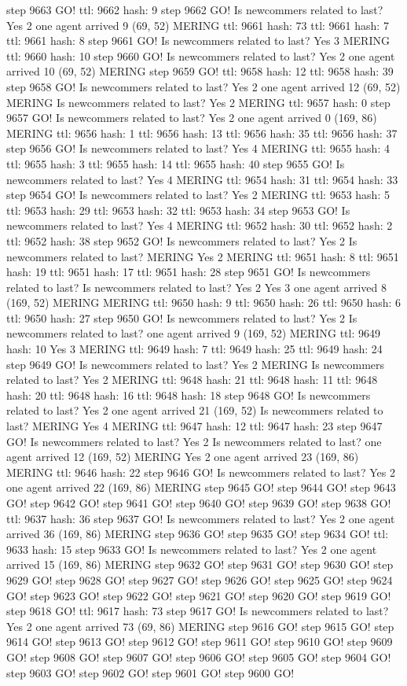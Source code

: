 step 9663 GO! ttl: 9662 hash: 9 step 9662 GO! Is newcommers related to last? Yes 2 one agent arrived 9 (69, 52) MERING ttl: 9661 hash: 73 ttl: 9661 hash: 7 ttl: 9661 hash: 8 step 9661 GO! Is newcommers related to last? Yes 3 MERING ttl: 9660 hash: 10 step 9660 GO! Is newcommers related to last? Yes 2 one agent arrived 10 (69, 52) MERING step 9659 GO! ttl: 9658 hash: 12 ttl: 9658 hash: 39 step 9658 GO! Is newcommers related to last? Yes 2 one agent arrived 12 (69, 52) MERING Is newcommers related to last? Yes 2 MERING ttl: 9657 hash: 0 step 9657 GO! Is newcommers related to last? Yes 2 one agent arrived 0 (169, 86) MERING ttl: 9656 hash: 1 ttl: 9656 hash: 13 ttl: 9656 hash: 35 ttl: 9656 hash: 37 step 9656 GO! Is newcommers related to last? Yes 4 MERING ttl: 9655 hash: 4 ttl: 9655 hash: 3 ttl: 9655 hash: 14 ttl: 9655 hash: 40 step 9655 GO! Is newcommers related to last? Yes 4 MERING ttl: 9654 hash: 31 ttl: 9654 hash: 33 step 9654 GO! Is newcommers related to last? Yes 2 MERING ttl: 9653 hash: 5 ttl: 9653 hash: 29 ttl: 9653 hash: 32 ttl: 9653 hash: 34 step 9653 GO! Is newcommers related to last? Yes 4 MERING ttl: 9652 hash: 30 ttl: 9652 hash: 2 ttl: 9652 hash: 38 step 9652 GO! Is newcommers related to last? Yes 2 Is newcommers related to last? MERING Yes 2 MERING ttl: 9651 hash: 8 ttl: 9651 hash: 19 ttl: 9651 hash: 17 ttl: 9651 hash: 28 step 9651 GO! Is newcommers related to last? Is newcommers related to last? Yes 2 Yes 3 one agent arrived 8 (169, 52) MERING MERING ttl: 9650 hash: 9 ttl: 9650 hash: 26 ttl: 9650 hash: 6 ttl: 9650 hash: 27 step 9650 GO! Is newcommers related to last? Yes 2 Is newcommers related to last? one agent arrived 9 (169, 52) MERING ttl: 9649 hash: 10 Yes 3 MERING ttl: 9649 hash: 7 ttl: 9649 hash: 25 ttl: 9649 hash: 24 step 9649 GO! Is newcommers related to last? Yes 2 MERING Is newcommers related to last? Yes 2 MERING ttl: 9648 hash: 21 ttl: 9648 hash: 11 ttl: 9648 hash: 20 ttl: 9648 hash: 16 ttl: 9648 hash: 18 step 9648 GO! Is newcommers related to last? Yes 2 one agent arrived 21 (169, 52) Is newcommers related to last? MERING Yes 4 MERING ttl: 9647 hash: 12 ttl: 9647 hash: 23 step 9647 GO! Is newcommers related to last? Yes 2 Is newcommers related to last? one agent arrived 12 (169, 52) MERING Yes 2 one agent arrived 23 (169, 86) MERING ttl: 9646 hash: 22 step 9646 GO! Is newcommers related to last? Yes 2 one agent arrived 22 (169, 86) MERING step 9645 GO! step 9644 GO! step 9643 GO! step 9642 GO! step 9641 GO! step 9640 GO! step 9639 GO! step 9638 GO! ttl: 9637 hash: 36 step 9637 GO! Is newcommers related to last? Yes 2 one agent arrived 36 (169, 86) MERING step 9636 GO! step 9635 GO! step 9634 GO! ttl: 9633 hash: 15 step 9633 GO! Is newcommers related to last? Yes 2 one agent arrived 15 (169, 86) MERING step 9632 GO! step 9631 GO! step 9630 GO! step 9629 GO! step 9628 GO! step 9627 GO! step 9626 GO! step 9625 GO! step 9624 GO! step 9623 GO! step 9622 GO! step 9621 GO! step 9620 GO! step 9619 GO! step 9618 GO! ttl: 9617 hash: 73 step 9617 GO! Is newcommers related to last? Yes 2 one agent arrived 73 (69, 86) MERING step 9616 GO! step 9615 GO! step 9614 GO! step 9613 GO! step 9612 GO! step 9611 GO! step 9610 GO! step 9609 GO! step 9608 GO! step 9607 GO! step 9606 GO! step 9605 GO! step 9604 GO! step 9603 GO! step 9602 GO! step 9601 GO! step 9600 GO! 